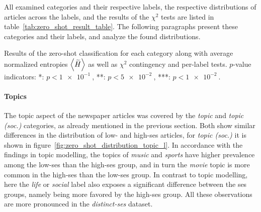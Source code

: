 All examined categories and their respective labels, the respective distributions of articles across the labels, and the results of the $\chi^2$ tests are listed in table~\ref{tab:zero_shot_result_table}. The following paragraphs present these categories and their labels, and analyze the found distributions.
\begin{table}
    \centering
    \resizebox{0.85\textwidth}{!}{}
    \caption{Results of the zero-shot classification for each category along with average normalized entropies $\Braket{\widetilde{H}}$ as well as $\chi^2$ contingency and per-label tests. $p$-value indicators: *: $p < \SI{1e-1}{}$, **: $p<\SI{5e-2}{}$, ***: $p<\SI{1e-2}{}$.}\label{tab:zero_shot_result_table}
\end{table}

\paragraph{Topics}
The topic aspect of the newspaper articles was covered by the \textit{topic} and \textit{topic (soc.)} categories, as already mentioned in the previous section. Both show similar differences in the distribution of low- and high-\gls{ses} articles, for \textit{topic (soc.)} it is shown in figure~\ref{fig:zero_shot_distribution_topic_l}. In accordance with the findings in topic modelling, the topics of \textit{music} and \textit{sports} have higher prevalence among the low-\gls{ses} than the high-\gls{ses} group, and in turn the \textit{movie} topic is more common in the high-\gls{ses} than the low-\gls{ses} group. In contrast to topic modelling, here the \textit{life} or \textit{social} label also exposes a significant difference between the \gls{ses} groups, namely being more favored by the high-\gls{ses} group. All these observations are more pronounced in the \textit{distinct-\gls{ses}} dataset.
